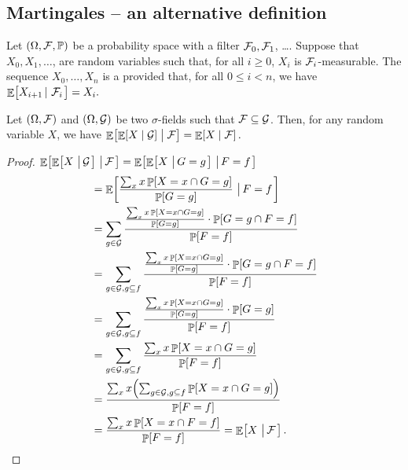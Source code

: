 \subsection{Martingales -- an alternative definition}

\begin{defn}
    Let $(\Omega, \mathcal{F}, \mathbb{P})$ be a probability space with a
    filter $\mathcal{F}_0, \mathcal{F}_1$, \ldots. Suppose that $X_0, X_1,
    \ldots$, are random variables such that, for all $i \geq 0$, $X_i$
    is $\mathcal{F}_i$-measurable. The sequence $X_0,\ldots, X_n$ is a
     provided that, for all
    $0 \le i < n$, we have
    \begin{math}
        \mathop{\mathbb{E}}\!\left[ { \bigl. X_{i+1} \left|\, {\,\mathcal{F}_i} \right.} \right] = X_i.
    \end{math}
\end{defn}

\begin{lemma}
    Let $(\Omega, \mathcal{F})$ and $(\Omega, \mathcal{G})$ be two
    $\sigma$-fields such that $\mathcal{F} \subseteq \mathcal{G}$. Then, for
    any random variable $X$, we have
    \begin{math}
        \ExCond{ \ExCond{X}{ \FamilyB}}{ \Family \bigr. } %
        =%
        \ExCond{ X}{ \Family }.
    \end{math}
\end{lemma}

\begin{proof}
    $\displaystyle \mathop{\mathbb{E}}\!\left[ { \mathop{\mathbb{E}}\!\left[ {X \,\left|\, { \mathcal{G}} \bigr.\right.} \right] \,\left|\, { \mathcal{F} } \bigr.\right.} \right] =  \mathop{\mathbb{E}}\!\left[ { \mathop{\mathbb{E}}\!\left[ {X
          \,\left|\, { G = g} \bigr.\right.} \right] \,\left|\, { F = f } \bigr.\right.} \right]$
    \begin{align*}
      &=%
        \Ex{ \frac{\sum_{x} x \Prob{X =x \cap G = g}}{\Prob{G=g}}
        \sep{F =f }}%
     \\&
     =%
        \sum_{g \in \FamilyB} \frac{\frac{\sum_x {x} \Prob{X =x \cap G =
        g}}{\Prob{G=g}} \cdot \Prob{ G = g \cap F = f
        }}{\Prob{F = f}} \\%
      &=%
        \sum_{g \in \FamilyB, g \subseteq f} \frac{\frac{\sum_x x
        \Prob{X =x \cap G = g}}{\Prob{G=g}} \cdot \Prob{ G = g
        \cap F = f }}{\Prob{F = f}} %
  \\&
  =%
        \sum_{g \in \FamilyB, g \subseteq f} \frac{\frac{\sum_x x
        \Prob{X =x \cap G = g}}{\Prob{G=g}} \cdot \Prob{ G = g
        }}{\Prob{F = f}} \\%
      &=%
        \sum_{g \in \FamilyB, g \subseteq f} \frac{\sum_x x \Prob{X =x
              \cap G = g}}{\Prob{F = f}}
        \\&
        =%
        \frac{\sum_x x \pth{ \sum_{g \in \FamilyB, g \subseteq f}
        \Prob{X =x \cap G = g}}}{\Prob{F = f}} \\
      &=%
        \frac{\sum_x x \Prob{ X =x \cap F =f }}{\Prob{F = f}} =%
        \Ex{ X \sep{ \Family}}.
    \end{align*}
\end{proof}


